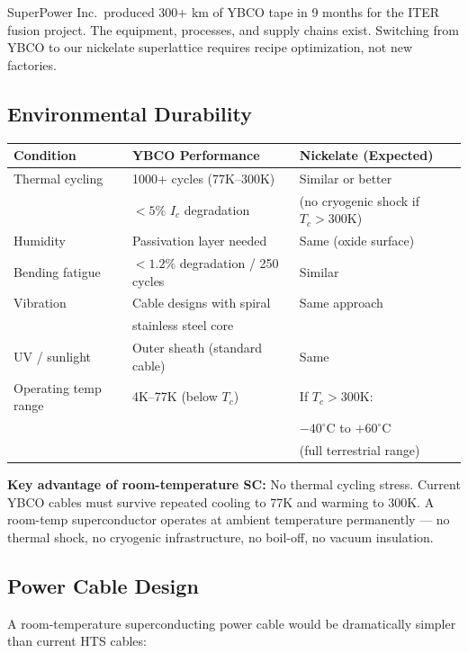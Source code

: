 \documentclass[11pt, a4paper]{article}
\begin{document}
SuperPower Inc.\ produced 300+ km of YBCO tape in 9 months for
the ITER fusion project. The equipment, processes, and supply
chains exist. Switching from YBCO to our nickelate superlattice
requires recipe optimization, not new factories.

\subsection{Environmental Durability}

\begin{center}
\begin{tabular}{@{}lll@{}}
\toprule
\textbf{Condition} & \textbf{YBCO Performance} & \textbf{Nickelate (Expected)} \\
\midrule
Thermal cycling & 1000+ cycles (77K--300K) & Similar or better \\
 & $< 5\%$ $I_c$ degradation & (no cryogenic shock if $T_c > 300$K) \\
Humidity & Passivation layer needed & Same (oxide surface) \\
Bending fatigue & $< 1.2\%$ degradation / 250 cycles & Similar \\
Vibration & Cable designs with spiral & Same approach \\
 & stainless steel core & \\
UV / sunlight & Outer sheath (standard cable) & Same \\
Operating temp range & 4K--77K (below $T_c$) & If $T_c > 300$K: \\
 & & $-40^\circ$C to $+60^\circ$C \\
 & & (full terrestrial range) \\
\bottomrule
\end{tabular}
\end{center}

\textbf{Key advantage of room-temperature SC:} No thermal cycling
stress. Current YBCO cables must survive repeated cooling to 77K
and warming to 300K. A room-temp superconductor operates at ambient
temperature permanently --- no thermal shock, no cryogenic
infrastructure, no boil-off, no vacuum insulation.

\subsection{Power Cable Design}

A room-temperature superconducting power cable would be
dramatically simpler than current HTS cables:
\end{document}
